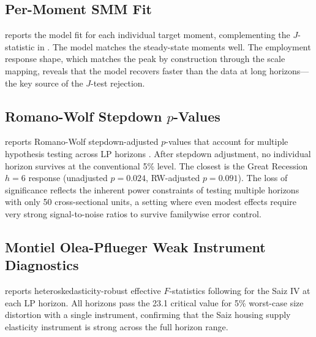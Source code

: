 \documentclass[12pt]{article}
\begin{document}
\subsection{Per-Moment SMM Fit}

 reports the model fit for each individual target moment, complementing the $J$-statistic in . The model matches the steady-state moments well. The employment response shape, which matches the peak by construction through the scale mapping, reveals that the model recovers faster than the data at long horizons---the key source of the $J$-test rejection.



\subsection{Romano-Wolf Stepdown $p$-Values}

 reports Romano-Wolf stepdown-adjusted $p$-values that account for multiple hypothesis testing across LP horizons \citep{romano2005stepwise}. After stepdown adjustment, no individual horizon survives at the conventional 5\% level. The closest is the Great Recession $h = 6$ response (unadjusted $p = 0.024$, RW-adjusted $p = 0.091$). The loss of significance reflects the inherent power constraints of testing multiple horizons with only 50 cross-sectional units, a setting where even modest effects require very strong signal-to-noise ratios to survive familywise error control.



\subsection{Montiel Olea-Pflueger Weak Instrument Diagnostics}

 reports heteroskedasticity-robust effective $F$-statistics following \citet{montiel2013robust} for the Saiz IV at each LP horizon. All horizons pass the 23.1 critical value for 5\% worst-case size distortion with a single instrument, confirming that the Saiz housing supply elasticity instrument is strong across the full horizon range.


\end{document}
